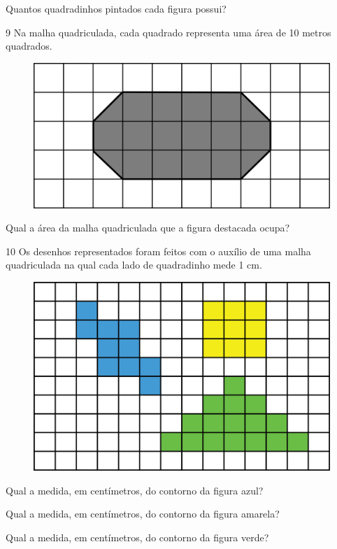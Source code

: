 Quantos quadradinhos pintados cada figura possui?

\num{9} Na malha quadriculada, cada quadrado representa uma área de 10 metros quadrados.

\begin{figure}[htpb!]
\centering
\includegraphics[width=.6\textwidth]{./media/image60.png}
\end{figure}

Qual a área da malha quadriculada que a figura destacada ocupa?

\num{10} Os desenhos representados foram feitos com o auxílio de uma malha
quadriculada na qual cada lado de quadradinho mede 1 cm.

\begin{figure}[htpb!]
\includegraphics[width=\textwidth]{./media/image57.png}
\end{figure}

\begin{escolha}
\item Qual a medida, em centímetros, do contorno da figura azul?
\reduline{18 cm\hfill}

\item Qual a medida, em centímetros, do contorno da figura amarela?
\reduline{12 cm\hfill}

\item Qual a medida, em centímetros, do contorno da figura verde?
\reduline{22 cm\hfill}
\end{escolha}

